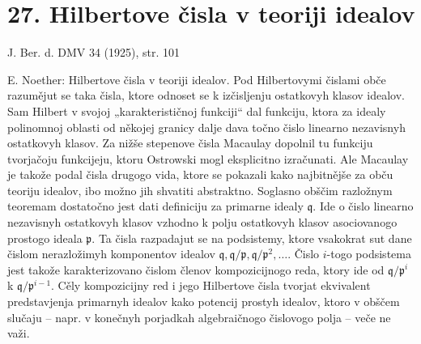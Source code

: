 \documentclass[11pt]{article}
\begin{document}
\section*{27. Hilbertove čisla v teoriji idealov}

\begin{center}
J. Ber. d. DMV 34 (1925), str. 101
\end{center}

E. Noether: Hilbertove čisla v teoriji idealov. Pod Hilbertovymi čislami obče razumějut se taka čisla, ktore odnoset se k izčisljenju ostatkovyh klasov idealov. Sam Hilbert v svojoj „karakterističnoj funkciji“ dal funkciju, ktora za idealy polinomnoj oblasti od někojej granicy dalje dava točno čislo linearno nezavisnyh ostatkovyh klasov. Za nižše stepenove čisla Macaulay dopolnil tu funkciju tvorjačoju funkcijeju, ktoru Ostrowski mogl eksplicitno izračunati. Ale Macaulay je takože podal čisla drugogo vida, ktore se pokazali kako najbitnějše za obču teoriju idealov, ibo možno jih shvatiti abstraktno. Soglasno obščim razložnym teoremam dostatočno jest dati definiciju za primarne idealy $\mathfrak q$. Ide o čislo linearno nezavisnyh ostatkovyh klasov vzhodno k polju ostatkovyh klasov asociovanogo prostogo ideala $\mathfrak p$. Ta čisla razpadajut se na podsistemy, ktore vsakokrat sut dane čislom nerazložimyh komponentov idealov $\mathfrak q,\mathfrak q/\mathfrak p,\mathfrak q/\mathfrak p^2,\ldots$. Čislo $i$-togo podsistema jest takože karakterizovano čislom členov kompozicijnogo reda, ktory ide od $\mathfrak q/\mathfrak p^i$ k $\mathfrak q/\mathfrak p^{i-1}$. Cěly kompozicijny red i jego Hilbertove čisla tvorjat ekvivalent predstavjenja primarnyh idealov kako potencij prostyh idealov, ktoro v obščem slučaju -- napr. v konečnyh porjadkah algebraičnogo čislovogo polja -- veče ne važi.
\end{document}
